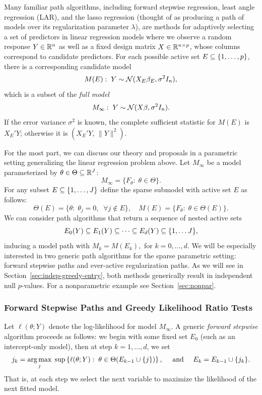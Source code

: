 \documentclass{article}
\begin{document}
Many familiar path algorithms, including forward stepwise regression, least angle regression (LAR), and the lasso regression (thought of as producing a path of models over its regularization parameter $\lambda$), are methods for adaptively selecting a set of predictors in linear regression models where we observe a random response $Y\in \mathbb{R}^n$ as well as a fixed design matrix $X\in \mathbb{R}^{n \times p}$, whose columns correspond to candidate predictors. For each possible active set $E \subseteq \{1,\ldots,p\}$, there is a corresponding candidate model
\[
M(E):\; Y \sim \mathcal{N}( X_E\beta_E, \sigma^2 I_n),
\]
which is a subset of the {\em full model}
\[
M_\infty:\; Y \sim \mathcal{N}(X\beta, \sigma^2I_n).
\]
If the error variance $\sigma^2$ is known, the complete sufficient statistic for $M(E)$ is $X_E'Y$; otherwise it is $\left(X_E'Y,\, \|Y\|^2\right)$.

For the most part, we can discuss our theory and proposals in a parametric setting generalizing the linear regression problem above. Let $M_\infty$ be a model parameterized by $\theta\in \Theta \subseteq \mathbb{R}^J$:
\[
M_\infty = \{F_\theta:\; \theta \in \Theta\}.
\]
For any subset $E\subseteq \{1,\ldots, J\}$ define the sparse submodel with active set $E$ as follows:
\[
\Theta(E) = \{\theta:\; \theta_j = 0, \;\;\forall j \notin E\}, 
\quad M(E) = \{F_\theta:\; \theta\in \Theta(E)\}.
\]
We can consider path algorithms that return a sequence of nested active sets
\[
E_0(Y) \subseteq E_1(Y) \subseteq \cdots \subseteq E_d(Y) \subseteq \{1,\ldots J\},
\]
inducing a model path with $M_k = M(E_k),$ for $k=0,\ldots,d$. We will be especially interested in two generic path algorithms for the sparse parametric setting: forward stepwise paths and ever-active regularization paths. As we will see in Section~\ref{sec:indep-greedy-entry}, both methods generically result in independent null $p$-values. For a nonparametric example see Section~\ref{sec:nonpar}.

\subsubsection{Forward Stepwise Paths and Greedy Likelihood Ratio Tests}
Let $\ell(\theta; Y)$ denote the log-likelihood for model
$M_\infty$. A generic {\em forward stepwise} algorithm proceeds as follows: we begin with some fixed set $E_0$ (such as an intercept-only model), then at step $k=1,\ldots,d$, we set
\begin{equation}
j_k = \operatorname*{arg\,max}_j \; \sup \left\{\ell(\theta; Y):\; \theta\in\Theta(E_{k-1} \cup \{j\})\right\}, \quad \text{ and } \quad
E_k = E_{k-1} \cup \{j_k\}.
\end{equation}
That is, at each step we select the next variable to maximize the likelihood of the next fitted model.
\end{document}
